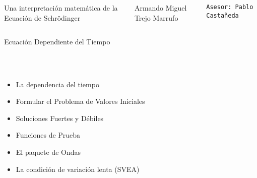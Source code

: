 \documentclass[aspectratio=1610]{beamer}
\begin{document}
\begin{frame}

  \vspace{0.02\textheight}
  
\begin{columns}[]
\column{37em}
\Large{\centerline{Una interpretación matemática de la Ecuación de Schrödinger}}

\vspace{0.1\textheight}

\vspace{0.1\textheight}

\small{\centerline{Armando Miguel Trejo Marrufo}}
\scriptsize{\centerline{\tt Asesor: Pablo Castañeda}}
\scriptsize{\centerline{}}
\end{columns}
\end{frame}


\begin{frame}
\begin{columns}
\column{37em}
\vspace{1cm}
\Huge{\centerline{Ecuación Dependiente del Tiempo}}
\end{columns}
\end{frame}


\begin{frame}
\frametitle{ }
\begin{columns}
\column{37em}
\begin{itemize}\itemsep1em
  \justifying
  \item  \textcolor{Ocean}{La dependencia del tiempo} 
  \item  \textcolor{Ocean}{Formular el Problema de Valores Iniciales} 
  \item  \textcolor{Ocean}{Soluciones Fuertes y Débiles} 
  \item  \textcolor{TextGreen}{Funciones de Prueba}
  \item  \textcolor{TextGreen}{El paquete de Ondas}
  \item  \textcolor{TextGreen}{La condición de variación lenta (SVEA)}
\end{itemize}
\end{columns}
\end{frame}
\end{document}
